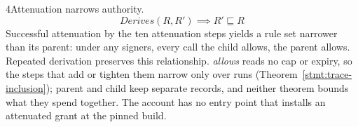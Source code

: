 \begin{perchstatement}{4}{Attenuation narrows authority.}\label{stmt:attenuation-narrows-authority}
\[\mathit{Derives}(R, R') \implies R' \sqsubseteq R\]
Successful attenuation by the ten attenuation steps yields a rule set narrower than its parent: under any signers, every call the child allows, the parent allows. Repeated derivation preserves this relationship. \emph{allows} reads no cap or expiry, so the steps that add or tighten them narrow only over runs (Theorem~\ref{stmt:trace-inclusion}); parent and child keep separate records, and neither theorem bounds what they spend together. The account has no entry point that installs an attenuated grant at the pinned build.
\end{perchstatement}
